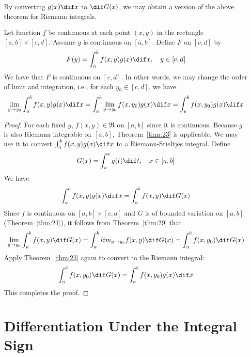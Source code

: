 \documentclass[thmcnt=section, color=blue, 12pt]{my-elegantbook}
\begin{document}
By converting $g(x) \dif x$ to $\dif G(x)$,
we may obtain a version of the above theorem for Riemann integrals.

\begin{theorem}
	Let function $f$ be continuous at each point $(x, y)$
	in the rectangle $[a, b] \times [c, d]$.
	Assume $g$ is continuous on $[a, b]$.
	Define $F$ on $[c, d]$ by
	\begin{align*}
		F(y) = \int_a^b f(x, y) g(x) \dif x, \quad y \in [c, d]
	\end{align*}
	We have that $F$ is continuous on $[c, d]$.
	In other words, we may change the order of limit and integration, i.e.,
	for each $y_0 \in [c, d]$, we have
	\begin{align*}
		\lim_{y \to y_0} \int_a^b f(x, y) g(x) \dif x
		= \int_a^b \lim_{y \to y_0} f(x, y_0) g(x) \dif x
		= \int_a^b f(x, y_0) g(x) \dif x
	\end{align*}
\end{theorem}

\begin{proof}
	For each fixed $y$, $f(x, y) \in \mathfrak{R}$ on $[a, b]$
	since it is continuous.
	Because $g$ is also Riemann integrable on $[a, b]$,
	Theorem~\ref{thm:23} is applicable.
	We may use it to convert $\int_a^b f(x, y) g(x) \dif x$
	to a Riemann-Stieltjes integral.
	Define
	\begin{align*}
		G(x) = \int_a^x g(t) \dif t, \quad x \in [a, b]
	\end{align*}
	We have
	\begin{align*}
		\int_a^b f(x, y) g(x) \dif x
		=  \int_a^b f(x, y) \dif G(x)
	\end{align*}
	Since $f$ is continuous on $[a, b]\times [c, d]$
	and $G$ is of bounded variation on $[a, b]$ (Theorem~\ref{thm:21}),
	it follows from Theorem~\ref{thm:29} that
	\begin{align*}
		\lim_{y \to y_0} \int_a^b f(x, y) \dif G(x)
		= \int_a^b lim_{y \to y_0} f(x, y) \dif G(x)
		= \int_a^b f(x, y_0) \dif G(x)
	\end{align*}
	Apply Theorem~\ref{thm:23} again to
	convert to the Riemann integral:
	\begin{align*}
		\int_a^b f(x, y_0) \dif G(x)
		= \int_a^b f(x, y_0) g(x) \dif x
	\end{align*}
	This completes the proof.
\end{proof}



\section{Differentiation Under the Integral Sign}
\end{document}
